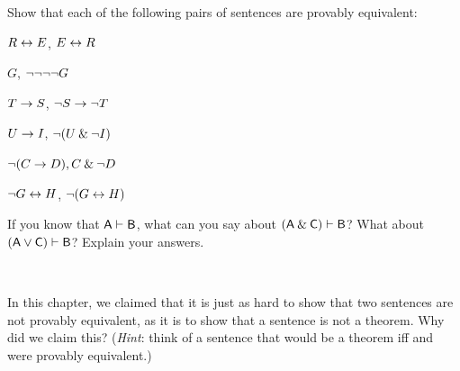 \problempart
Show that each of the following pairs of sentences are provably equivalent:
\begin{earg}
\item $R \leftrightarrow E$, $E \leftrightarrow R$
\item $G$, ${\neg}{\neg}{\neg}{\neg} G$
\item $T\rightarrow S$, ${\neg} S \rightarrow {\neg} T$
\item $U \rightarrow I$, ${\neg}(U \mathbin{\&} {\neg} I)$
\item ${\neg} (C \rightarrow D), C \mathbin{\&} {\neg} D$
\item ${\neg} G \leftrightarrow H$, ${\neg}(G \leftrightarrow H)$ 
\end{earg}

\problempart
If you know that $\mathsf{A}\vdash\mathsf{B}$, what can you say about $(\mathsf{A}\mathbin{\&}\mathsf{C})\vdash\mathsf{B}$? What about $(\mathsf{A}\vee\mathsf{C})\vdash\mathsf{B}$? Explain your answers.

\

\problempart In this chapter, we claimed that it is just as hard to show that two sentences are not provably equivalent, as it is to show that a sentence is not a theorem. Why did we claim this? (\emph{Hint}: think of a sentence that would be a theorem iff  and  were provably equivalent.)


